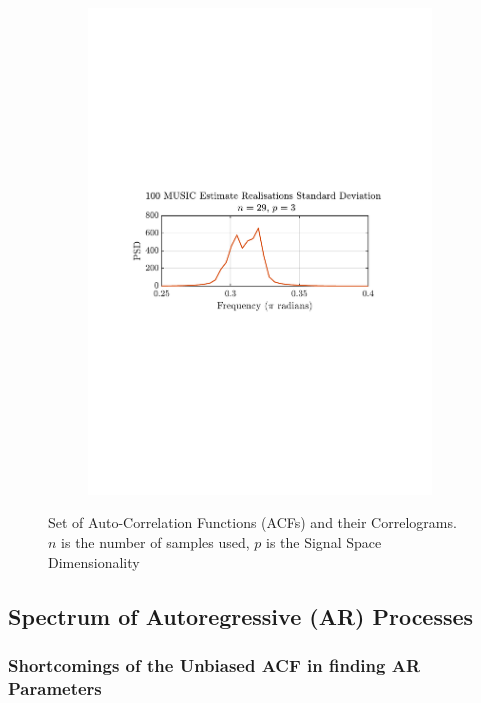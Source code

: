 \documentclass[12pt]{article}
\begin{document}
\begin{figure}[H]
\begin{subfigure}{0.49\textwidth}
			\includegraphics[trim={2.2cm 11.2cm 3.15cm  11.2cm}, clip, width=\textwidth]{../MATLAB/figures/q1_3e_fig06.pdf} 
		\end{subfigure}
		\captionsetup{justification=centering}
		\caption{Set of Auto-Correlation Functions (ACFs) and their Correlograms. \\ $n$ is the number of samples used, $p$ is the Signal Space Dimensionality}
		\label{fig: 1-3e}
	\end{figure}
	
	\subsection{Spectrum of Autoregressive (AR) Processes} \label{sec: 1-4-spectrums-AR}
	
	\subsubsection{Shortcomings of the Unbiased ACF in finding AR Parameters}
	
\end{document}
